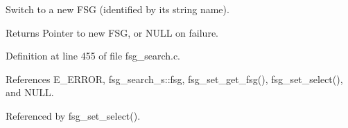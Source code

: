 \-Switch to a new \-F\-S\-G (identified by its string name). 

\begin{DoxyReturn}{\-Returns}
\-Pointer to new \-F\-S\-G, or \-N\-U\-L\-L on failure. 
\end{DoxyReturn}


\-Definition at line 455 of file fsg\-\_\-search.\-c.



\-References \-E\-\_\-\-E\-R\-R\-O\-R, fsg\-\_\-search\-\_\-s\-::fsg, fsg\-\_\-set\-\_\-get\-\_\-fsg(), fsg\-\_\-set\-\_\-select(), and \-N\-U\-L\-L.



\-Referenced by fsg\-\_\-set\-\_\-select().

